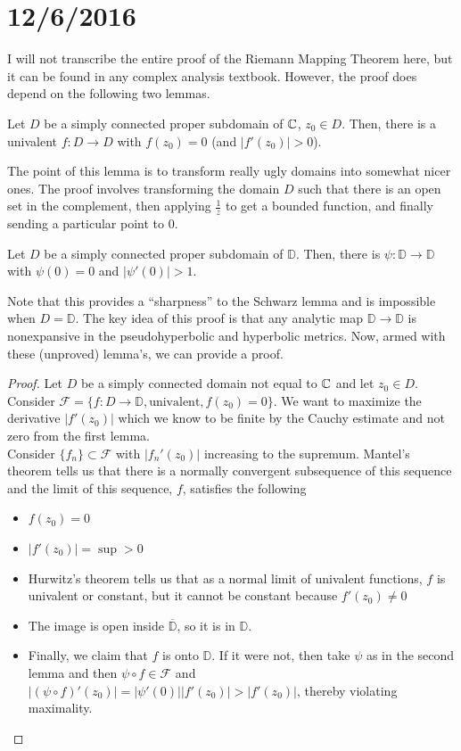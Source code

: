 \documentclass[11pt,leqno,oneside]{amsart}
\numberwithin{thm}{section}
\newcommand{\D}{\mathbb{D}}
\begin{document}
  \section{12/6/2016}
  I will not transcribe the entire proof of the Riemann Mapping Theorem here,
  but it can be found in any complex analysis textbook. However, the
  proof does depend on the following two lemmas.
  \begin{lem}
    Let $D$ be a simply connected proper subdomain of ${\mathbb C}$, $z_0 \in
    D$. Then, there is a univalent $f: D \to D$ with $f(z_0) = 0$ (and
    $|f'(z_0)| > 0$).
  \end{lem}
  The point of this lemma is to transform really ugly domains into
  somewhat nicer ones. The proof involves transforming the domain $D$
  such that there is an open set in the complement, then applying
  $\frac{1}{z}$ to get a bounded function, and finally sending a
  particular point to 0.
  \begin{lem}
    Let $D$ be a simply connected proper subdomain of $\D$. Then,
    there is $\psi: \D \to \D$ with $\psi(0) = 0$ and $|\psi'(0)| > 1$.
  \end{lem}
  Note that this provides a ``sharpness'' to the Schwarz lemma and is
  impossible when $D = \D$. The key idea of this proof is that any
  analytic map $\D \to \D$ is nonexpansive in the pseudohyperbolic and
  hyperbolic metrics. Now, armed with these (unproved) lemma's, we can
  provide a proof.
  \begin{proof}
    Let $D$ be a simply connected domain not equal to ${\mathbb C}$ and let
    $z_0 \in D$. Consider $\mathcal{F} = \{f: D \to \D, \text{
      univalent}, f(z_0) = 0\}$. We want to maximize the derivative
    $|f'(z_0)|$ which we know to be finite by the Cauchy estimate and
    not zero from the first lemma. \\

    Consider $\{f_n\} \subset \mathcal{F}$ with $|f_n'(z_0)|$
    increasing to the supremum. Mantel's theorem tells us that there
    is a normally convergent subsequence of this sequence and the
    limit of this sequence, $f$, satisfies the following
    \begin{itemize}
    \item $f(z_0) = 0$
    \item $|f'(z_0)| = \sup > 0$
    \item Hurwitz's theorem tells us that as a normal limit of
      univalent functions, $f$ is univalent or constant, but it cannot
      be constant because $f'(z_0) \neq 0$
    \item The image is open inside $\overline{\D}$, so it is in $\D$.
    \item Finally, we claim that $f$ is onto $\D$. If it were not,
      then take $\psi$ as in the second lemma and then $\psi \circ f
      \in \mathcal{F}$ and $|(\psi \circ f)'(z_0)| =
      |\psi'(0)||f'(z_0)| > |f'(z_0)|$, thereby violating maximality.
    \end{itemize}
  \end{proof}
\end{document}
